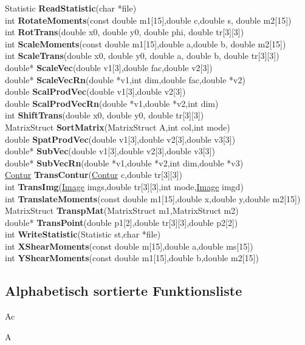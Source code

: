 \documentclass[10pt,titlepage]{article}
\def\functionlistentry#1#2#3#4#5#6{\noindent #1 {\bf #2}(#3) \dotfill #6\\}
\def\letterref#1{}
\def\letterlabel#1{\vspace{0.5cm}\centerline{\Large #1}}
\begin{document}
{{\functionlistentry{Statistic}{ReadStatistic}{char *file}{1602}{obsolet}{}
\functionlistentry{int}{RotateMoments}{const double m1[15],double c,double s, double m2[15]}{1612}{obsolet}{}
\functionlistentry{int}{RotTrans}{double x0, double y0, double phi, double tr[3][3]}{1586}{obsolet}{}
\functionlistentry{int}{ScaleMoments}{const double m1[15],double a,double b, double m2[15]}{1611}{obsolet}{}
\functionlistentry{int}{ScaleTrans}{double x0, double y0, double a, double b, double tr[3][3]}{1587}{obsolet}{}
\functionlistentry{double*}{ScaleVec}{double v1[3],double fac,double v2[3]}{1561}{obsolet}{}
\functionlistentry{double*}{ScaleVecRn}{double *v1,int dim,double fac,double *v2}{1571}{obsolet}{}
\functionlistentry{double}{ScalProdVec}{double v1[3],double v2[3]}{1562}{obsolet}{}
\functionlistentry{double}{ScalProdVecRn}{double *v1,double *v2,int dim}{1572}{obsolet}{}
\functionlistentry{int}{ShiftTrans}{double x0, double y0, double tr[3][3]}{1585}{obsolet}{}
\functionlistentry{MatrixStruct}{SortMatrix}{MatrixStruct A,int col,int mode}{1583}{obsolet}{}
\functionlistentry{double}{SpatProdVec}{double v1[3],double v2[3],double v3[3]}{1564}{obsolet}{}
\functionlistentry{double*}{SubVec}{double v1[3],double v2[3],double v3[3]}{1559}{obsolet}{}
\functionlistentry{double*}{SubVecRn}{double *v1,double *v2,int dim,double *v3}{1569}{obsolet}{}
\functionlistentry{\hyperlink{Contur}{Contur}}{TransContur}{\hyperlink{Contur}{Contur} c,double tr[3][3]}{1593}{obsolet}{}
\functionlistentry{int}{TransImg}{\hyperlink{Image}{Image} imgs,double tr[3][3],int mode,\hyperlink{Image}{Image} imgd}{1592}{obsolet}{}
\functionlistentry{int}{TranslateMoments}{const double m1[15],double x,double y,double m2[15]}{1607}{obsolet}{}
\functionlistentry{MatrixStruct}{TranspMat}{MatrixStruct m1,MatrixStruct m2}{1579}{obsolet}{}
\functionlistentry{double*}{TransPoint}{double p1[2],double tr[3][3],double p2[2]}{1591}{obsolet}{}
\functionlistentry{int}{WriteStatistic}{Statistic st,char *file}{1601}{obsolet}{}
\functionlistentry{int}{XShearMoments}{const double m[15],double a,double ms[15]}{1609}{obsolet}{}
\functionlistentry{int}{YShearMoments}{const double m1[15],double b,double m2[15]}{1610}{obsolet}{}

 
\newpage
\subsection{Alphabetisch sortierte Funktionsliste}
\makeatletter{}\label{FunktionsListe}

\letterlabel{Ac}
\letterlabel{A}
\letterref{A}
\letterref{B}
\letterref{C}
\letterref{D}
\letterref{E}
\letterref{F}
\letterref{G}
\letterref{H}
\letterref{I}
\letterref{K}
\letterref{L}
\letterref{M}
\letterref{N}
\letterref{O}
\letterref{P}
\letterref{Q}
\letterref{R}
\letterref{S}
\letterref{T}
\letterref{U}
\letterref{V}
\letterref{W}
\letterref{X}
\letterref{Y}
\letterref{Z}

}}
\end{document}
